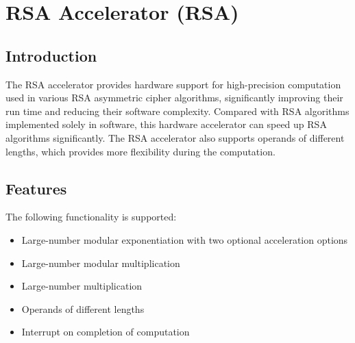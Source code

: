 \documentclass[main\_\_EN.tex]{subfiles}
\begin{document}

\ifglobal
\else
    {\let\clearpage\relax \listoftodos}
    {\let\clearpage\relax \listofdonetodos}
    \tableofcontents
\fi



\hypertarget{rsa}{}
\chapter{RSA Accelerator (RSA)}\label{mod:rsa}
\section{Introduction}

The RSA accelerator provides hardware support for high-precision computation used in various RSA asymmetric cipher algorithms, significantly improving their run time and reducing their software complexity. Compared with RSA algorithms implemented solely in software, this hardware accelerator can speed up RSA algorithms significantly. The RSA accelerator also supports operands of different lengths, which provides more flexibility during the computation. 
\section{Features}

The following functionality is supported:

\begin{itemize}
    \item Large-number modular exponentiation with two optional acceleration options
    \item Large-number modular multiplication 
    \item Large-number multiplication 
    \item Operands of different lengths
    \item Interrupt on completion of computation 
\end{itemize}
\end{document}
